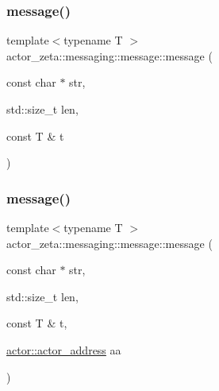\mbox{\label{classactor__zeta_1_1messaging_1_1message_a8caea1df1350631fa5c803e3ac368c6d}} 
\subsubsection{\texorpdfstring{message()}{message()}\hspace{0.1cm}{\footnotesize\ttfamily [8/11]}}
{\footnotesize\ttfamily template$<$typename T $>$ \\
actor\+\_\+zeta\+::messaging\+::message\+::message (\begin{DoxyParamCaption}\item[{const char $\ast$}]{str,  }\item[{std\+::size\+\_\+t}]{len,  }\item[{const T \&}]{t }\end{DoxyParamCaption})\hspace{0.3cm}{\ttfamily [inline]}}

\mbox{\label{classactor__zeta_1_1messaging_1_1message_a1e2810d89cc8f75aa451057fe7252e07}} 
\subsubsection{\texorpdfstring{message()}{message()}\hspace{0.1cm}{\footnotesize\ttfamily [9/11]}}
{\footnotesize\ttfamily template$<$typename T $>$ \\
actor\+\_\+zeta\+::messaging\+::message\+::message (\begin{DoxyParamCaption}\item[{const char $\ast$}]{str,  }\item[{std\+::size\+\_\+t}]{len,  }\item[{const T \&}]{t,  }\item[{\hyperlink{classactor__zeta_1_1actor_1_1actor__address}{actor\+::actor\+\_\+address}}]{aa }\end{DoxyParamCaption})\hspace{0.3cm}{\ttfamily [inline]}}

